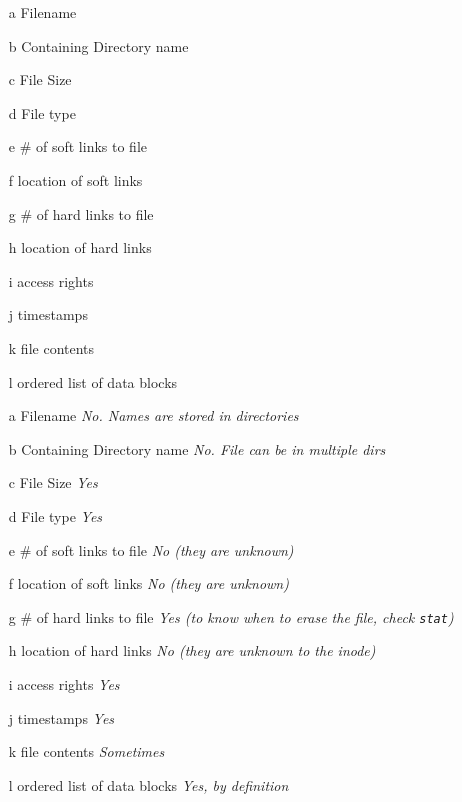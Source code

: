   \begin{slide}
    
     \small
      \begin{itemize}
        \item[a] Filename
        \item[b] Containing Directory name
        \item[c] File Size 
        \item[d] File type
        \item[e] \# of soft links to file
        \item[f] location of soft links 
        \item[g] \# of hard links to file  
        \item[h] location of hard links
        \item[i] access rights
        \item[j] timestamps
        \item[k] file contents
        \item[l] ordered list of data blocks     
      \end{itemize}
  \end{slide}

  \begin{slide}
    
     \small
      \begin{itemize}
        \item[a] Filename \textit{No. Names are stored in directories}
        \item[b] Containing Directory name \textit{No. File can be in multiple dirs}
        \item[c] File Size \textit{Yes}
        \item[d] File type \textit{Yes}
        \item[e] \# of soft links to file \textit{No (they are unknown)}
        \item[f] location of soft links \textit{No (they are unknown)}
        \item[g] \# of hard links to file \textit{Yes (to know when to erase the file, check \texttt{stat})}
        \item[h] location of hard links \textit{No (they are unknown to the inode)}
        \item[i] access rights \textit{Yes}
        \item[j] timestamps \textit{Yes}
        \item[k] file contents \textit{Sometimes}
        \item[l] ordered list of data blocks \textit{Yes, by definition} 
      \end{itemize}
  \end{slide}

